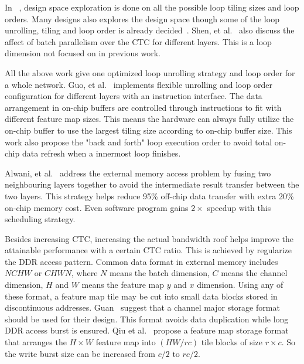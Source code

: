 In ~\cite{zhang2015optimizing, ma2017optimizing}, design space exploration is done on all the possible loop tiling sizes and loop orders. Many designs also explores the design space though some of the loop unrolling, tiling and loop order is already decided~\cite{motamedi2016design, qiu2016going}. Shen, et al.~\cite{shen2017escher} also discuss the affect of batch parallelism over the CTC for different layers. This is a loop dimension not focused on in previous work.

All the above work give one optimized loop unrolling strategy and loop order for a whole network. Guo, et al.~\cite{guo2017angel} implements flexible unrolling and loop order configuration for different layers with an instruction interface. The data arrangement in on-chip buffers are controlled through instructions to fit with different feature map sizes. This means the hardware can always fully utilize the on-chip buffer to use the largest tiling size according to on-chip buffer size. This work also propose the "back and forth" loop execution order to avoid total on-chip data refresh when a innermost loop finishes.

Alwani, et al.~\cite{alwani2016fused} address the external memory access problem by fusing two neighbouring layers together to avoid the intermediate result transfer between the two layers. This strategy helps reduce 95\% off-chip data transfer with extra 20\% on-chip memory cost. Even software program gains $2\times$ speedup with this scheduling strategy.

Besides increasing CTC, increasing the actual bandwidth roof helps improve the attainable performance with a certain CTC ratio. This is achieved by regularize the DDR access pattern. Common data format in external memory includes $NCHW$ or $CHWN$, where $N$ means the batch dimension, $C$ means the channel dimension, $H$ and $W$ means the feature map $y$ and $x$ dimension. Using any of these format, a feature map tile may be cut into small data blocks stored in discontinuous addresses. Guan~\cite{guan2017fp} suggest that a channel major storage format should be used for their design. This format avoids data duplication while long DDR access burst is ensured. Qiu et al.~\cite{qiu2016going} propose a feature map storage format that arranges the $H\times W$ feature map into $(HW/rc)$ tile blocks of size $r\times c$. So the write burst size can be increased from $c/2$ to $rc/2$.




